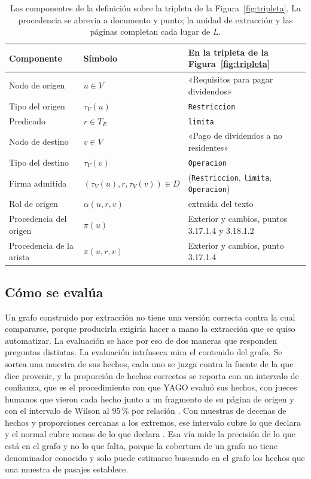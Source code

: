 \documentclass[12pt,a4paper]{report}
\begin{document}
\begin{table}[H]
  \centering
  \small
  \renewcommand{\arraystretch}{1.15}
\begin{tabularx}{\textwidth}{@{}l l >{\raggedright\arraybackslash}X@{}}    \toprule
    Componente & Símbolo & En la tripleta de la Figura~\ref{fig:tripleta} \\
    \midrule
    Nodo de origen & $u \in V$ & «Requisitos para pagar dividendos» \\
    Tipo del origen & $\tau_V(u)$ & \texttt{Restriccion} \\
    Predicado & $r \in T_E$ & \texttt{limita} \\
    Nodo de destino & $v \in V$ & «Pago de dividendos a no residentes» \\
    Tipo del destino & $\tau_V(v)$ & \texttt{Operacion} \\
    Firma admitida & $(\tau_V(u), r, \tau_V(v)) \in D$ & (\texttt{Restriccion}, \texttt{limita}, \texttt{Operacion}) \\
    Rol de origen & $\alpha(u, r, v)$ & extraída del texto \\
    Procedencia del origen & $\pi(u)$ & Exterior y cambios, puntos 3.17.1.4 y 3.18.1.2 \\
    Procedencia de la arista & $\pi(u, r, v)$ & Exterior y cambios, punto 3.17.1.4 \\
    \bottomrule
  \end{tabularx}
  \caption[La definición sobre un ejemplo]{Los componentes de la definición sobre la tripleta de la Figura~\ref{fig:tripleta}. La procedencia se abrevia a documento y punto; la unidad de extracción y las páginas completan cada lugar de $L$.}
  \label{tab:definicion_ejemplo}
\end{table}

\subsection{Cómo se evalúa}

Un grafo construido por extracción no tiene una versión correcta contra la cual compararse, porque producirla exigiría hacer a mano la extracción que se quiso automatizar. La evaluación se hace por eso de dos maneras que responden preguntas distintas. La evaluación intrínseca mira el contenido del grafo. Se sortea una muestra de sus hechos, cada uno se juzga contra la fuente de la que dice provenir, y la proporción de hechos correctos se reporta con un intervalo de confianza, que es el procedimiento con que YAGO evaluó sus hechos, con jueces humanos que vieron cada hecho junto a un fragmento de su página de origen y con el intervalo de Wilson al 95\,\% por relación \cite{suchanek2007yago}. Con muestras de decenas de hechos y proporciones cercanas a los extremos, ese intervalo \cite{wilson1927} cubre lo que declara y el normal cubre menos de lo que declara \cite{brown2001}. Esa vía mide la precisión de lo que está en el grafo y no lo que falta, porque la cobertura de un grafo no tiene denominador conocido y solo puede estimarse buscando en el grafo los hechos que una muestra de pasajes establece.
\end{document}
